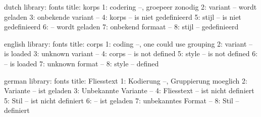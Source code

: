 

\unprotect

\startmessages  dutch  library: fonts
  title: korps
      1: codering --, groepeer zonodig
      2: variant -- wordt geladen
      3: onbekende variant --
      4: korps -- is niet gedefinieerd
      5: stijl -- is niet gedefinieerd
      6: -- wordt geladen
      7: onbekend formaat --
      8: stijl -- gedefinieerd
\stopmessages

\startmessages  english  library: fonts
  title: corps
      1: coding --, one could use grouping
      2: variant -- is loaded
      3: unknown variant --
      4: corps -- is not defined
      5: style -- is not defined
      6: -- is loaded
      7: unknown format --
      8: style -- defined
\stopmessages

\startmessages  german  library: fonts
  title: Fliesstext
      1: Kodierung --, Gruppierung moeglich
      2: Variante -- ist geladen
      3: Unbekannte Variante --
      4: Fliesstext -- ist nicht definiert
      5: Stil -- ist nicht definiert
      6: -- ist geladen
      7: unbekanntes Format --
      8: Stil -- definiert
\stopmessages


